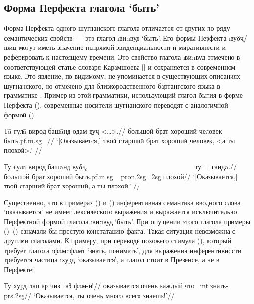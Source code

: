 {{{\subsection{Форма Перфекта глагола ‘быть’} \label{evid-be}

Форма Перфекта одного шугнанского глагола отличается от других по ряду семантических свойств~— это глагол \i{ви}:\i{вуд} ‘быть’. Его формы Перфекта \i{вуδҷ}/\i{виц} могут иметь значение непрямой эвиденциальности и миративности и реферировать к настоящему времени. Это свойство глагола \i{ви}:\i{вуд} отмечено в соответствующей статье словаря Карамшоева [\cite*{karamshoev1988}] и сохраняется в современном языке. Это явление, по-видимому, не упоминается в существующих описаниях шугнанского, но отмечено для близкородственного бартангского языка в грамматике \parencite[170]{karamkhudoev1973}. Пример из этой грамматики, использующий глагол бытия в форме Перфекта (), современные носители шугнанского переводят с аналогичной формой ().

\begingl
\gla Тā ғулā вирод башāнд одам \b{вуҷ} <…>.//
 большой брат хороший человек быть.{\sc pf.m.sg} ~//
\glft ‘[\b{Оказывается},] твой старший брат хороший человек, <а ты плохой>.’ //
\endgl \xe

\begingl
\gla Ту ғулā вирод башāнд \b{вуδҷ}, ~~~~~~~~~~~~~~~~~~~~~~~~~~~~~~ ту=т гандā.//
 большой брат хороший быть.{\sc pf.m.sg} ~ {\sc pron.2sg=2sg} плохой//
\glft ‘[\b{Оказывается},] твой старший брат хороший, а ты плохой.’ //
\endgl \xe

Существенно, что в примерах () и () инферентивная семантика вводного слова ‘оказывается’ не имеет лексического выражения и выражается исключительно Перфектной формой глагола \i{ви}:\i{вуд} ‘быть’. При опущении этого глагола примеры ()–() означали бы простую констатацию факта. Такая ситуация невозможна с другими глаголами. К примеру, при переводе похожего стимула (), который требует глагола \i{фāм}:\i{фāмт} ‘знать, понимать’, для выражения инферентивности требуется частица \i{хурд} ‘оказывается’, а глагол стоит в Презенсе, а не в Перфекте:

\begingl
\gla Ту хурд лап ар чӣз=аθ \b{фāм-и}!//
 оказывается очень каждый что={\sc int} знать-{\sc prs.2sg}//
\glft ‘Оказывается, ты очень много всего \b{знаешь}!’//
\endgl \xe

}}}
